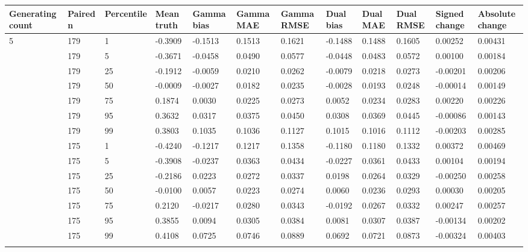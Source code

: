 \begin{longtable}{llllllllllll}
\toprule
Generating count & Paired n & Percentile & Mean truth & Gamma bias & Gamma MAE & Gamma RMSE & Dual bias & Dual MAE & Dual RMSE & Signed change & Absolute change \\
\midrule\endhead
5 & 179 & 1 & -0.3909 & -0.1513 & 0.1513 & 0.1621 & -0.1488 & 0.1488 & 0.1605 & 0.00252 & 0.00431 \\ \addlinespace[3pt]
5 & 179 & 5 & -0.3671 & -0.0458 & 0.0490 & 0.0577 & -0.0448 & 0.0483 & 0.0572 & 0.00100 & 0.00184 \\ \addlinespace[3pt]
5 & 179 & 25 & -0.1912 & -0.0059 & 0.0210 & 0.0262 & -0.0079 & 0.0218 & 0.0273 & -0.00201 & 0.00206 \\ \addlinespace[3pt]
5 & 179 & 50 & -0.0009 & -0.0027 & 0.0182 & 0.0235 & -0.0028 & 0.0193 & 0.0248 & -0.00014 & 0.00149 \\ \addlinespace[3pt]
5 & 179 & 75 & 0.1874 & 0.0030 & 0.0225 & 0.0273 & 0.0052 & 0.0234 & 0.0283 & 0.00220 & 0.00226 \\ \addlinespace[3pt]
5 & 179 & 95 & 0.3632 & 0.0317 & 0.0375 & 0.0450 & 0.0308 & 0.0369 & 0.0445 & -0.00086 & 0.00143 \\ \addlinespace[3pt]
5 & 179 & 99 & 0.3803 & 0.1035 & 0.1036 & 0.1127 & 0.1015 & 0.1016 & 0.1112 & -0.00203 & 0.00285 \\ \addlinespace[3pt]
10 & 175 & 1 & -0.4240 & -0.1217 & 0.1217 & 0.1358 & -0.1180 & 0.1180 & 0.1332 & 0.00372 & 0.00469 \\ \addlinespace[3pt]
10 & 175 & 5 & -0.3908 & -0.0237 & 0.0363 & 0.0434 & -0.0227 & 0.0361 & 0.0433 & 0.00104 & 0.00194 \\ \addlinespace[3pt]
10 & 175 & 25 & -0.2186 & 0.0223 & 0.0272 & 0.0337 & 0.0198 & 0.0264 & 0.0329 & -0.00250 & 0.00258 \\ \addlinespace[3pt]
10 & 175 & 50 & -0.0100 & 0.0057 & 0.0223 & 0.0274 & 0.0060 & 0.0236 & 0.0293 & 0.00030 & 0.00205 \\ \addlinespace[3pt]
10 & 175 & 75 & 0.2120 & -0.0217 & 0.0280 & 0.0343 & -0.0192 & 0.0267 & 0.0332 & 0.00247 & 0.00257 \\ \addlinespace[3pt]
10 & 175 & 95 & 0.3855 & 0.0094 & 0.0305 & 0.0384 & 0.0081 & 0.0307 & 0.0387 & -0.00134 & 0.00202 \\ \addlinespace[3pt]
10 & 175 & 99 & 0.4108 & 0.0725 & 0.0746 & 0.0889 & 0.0692 & 0.0721 & 0.0873 & -0.00324 & 0.00403 \\ \addlinespace[3pt]

\end{longtable}
